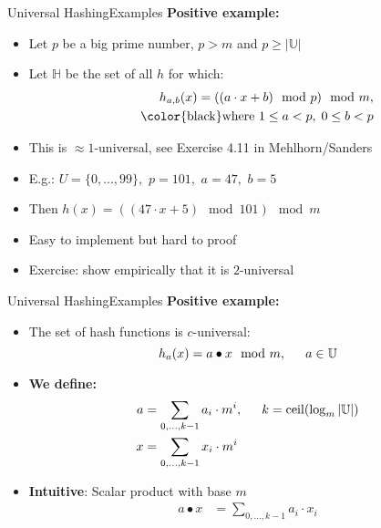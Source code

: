\begin{frame}{Universal Hashing}{Examples}
  \textbf{Positive example:}
  \begin{itemize}
    \item<1->
      Let {\color{MainA}$p$} be a big prime number, {\color{MainA}$p > m$}
      and {\color{MainA}$p \geq \vert \mathbb{U} \vert$}
    \item<2->
      Let {\color{MainA}$\mathbb{H}$} be the set of all {\color{MainA}$h$}
      for which:
      {\color{MainA}
      \begin{align*}
        h_{a, b}(x) = ((a \cdot x + b) \mod p) \mod m,\\
        \hspace*{1.5em} \text{{\color{black}where }}
        1 \leq a < p, \; 0 \leq b < p
      \end{align*}}
    \item<3->
      This is {\color{MainA}$\approx1$-universal},
      see {\color{teal}Exercise 4.11} in Mehlhorn/Sanders
    \item<4->
      E.g.: {\color{MainA}$U=\{0,...,99\},$ \hspace{0.5em} $p=101,$
        \hspace{0.5em} $a=47,$ $b=5$}
   \item<5->
     Then {\color{MainA}$h(x) = ((47 \cdot x + 5) \mod 101) \mod m$}
   \item<6->
     Easy to implement but hard to proof
   \item<7->
     Exercise: show empirically that it is {\color{MainA}$2$}-universal
  \end{itemize}
\end{frame}


\begin{frame}{Universal Hashing}{Examples}
  \textbf{Positive example:}
  \begin{itemize}
    \item<1->
      The set of hash functions is {\color{MainA}$c$}-universal:
      {\color{MainA}
      \[h_{a}(x) = a \bullet x \mod m, \hspace*{1.5em} a \in \mathbb{U}\]}
    \item<2->
      \textbf{We define:}
      {\color{MainA}
      \begin{align*}
        a &= \sum_{0, \ldots, k-1} a_i \cdot m^i,
        \hspace*{1.5em} k = \mathrm{ceil}(\log_m \vert \mathbb{U} \vert)\\
        x &= \sum_{0, \ldots, k-1} x_i \cdot m^i
      \end{align*}}
    \item<3->
      \textbf{Intuitive}: Scalar product with base {\color{MainA}$m$}
      {\color{MainA}
      \begin{align*}
        a \bullet x &= \sum_{0, \ldots, k-1} a_i \cdot x_i
      \end{align*}}
  \end{itemize}
\end{frame}


